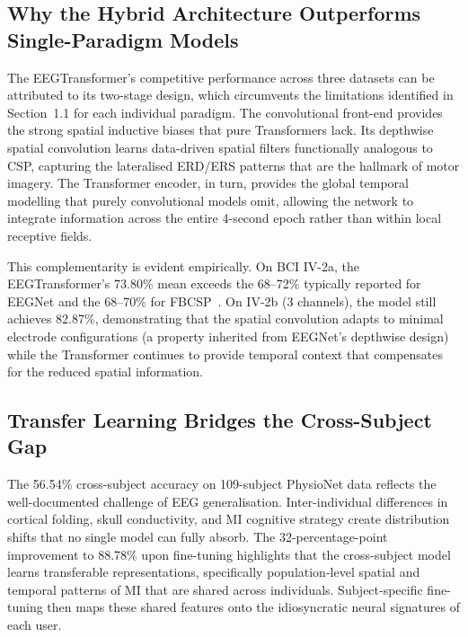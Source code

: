 \documentclass[12pt, a4paper]{article}
\begin{document}
\subsection{Why the Hybrid Architecture Outperforms Single-Paradigm Models}

The EEGTransformer's competitive performance across three datasets can be attributed to its two-stage design, which circumvents the limitations identified in Section~1.1 for each individual paradigm. The convolutional front-end provides the strong spatial inductive biases that pure Transformers lack. Its depthwise spatial convolution learns data-driven spatial filters functionally analogous to CSP, capturing the lateralised ERD/ERS patterns that are the hallmark of motor imagery. The Transformer encoder, in turn, provides the global temporal modelling that purely convolutional models omit, allowing the network to integrate information across the entire 4-second epoch rather than within local receptive fields.

This complementarity is evident empirically. On BCI IV-2a, the EEGTransformer's 73.80\% mean exceeds the 68--72\% typically reported for EEGNet and the 68--70\% for FBCSP~\cite{hameed2025enhancing}. On IV-2b (3 channels), the model still achieves 82.87\%, demonstrating that the spatial convolution adapts to minimal electrode configurations (a property inherited from EEGNet's depthwise design) while the Transformer continues to provide temporal context that compensates for the reduced spatial information.

\subsection{Transfer Learning Bridges the Cross-Subject Gap}

The 56.54\% cross-subject accuracy on 109-subject PhysioNet data reflects the well-documented challenge of EEG generalisation. Inter-individual differences in cortical folding, skull conductivity, and MI cognitive strategy create distribution shifts that no single model can fully absorb. The 32-percentage-point improvement to 88.78\% upon fine-tuning highlights that the cross-subject model learns transferable representations, specifically population-level spatial and temporal patterns of MI that are shared across individuals. Subject-specific fine-tuning then maps these shared features onto the idiosyncratic neural signatures of each user.
\end{document}
